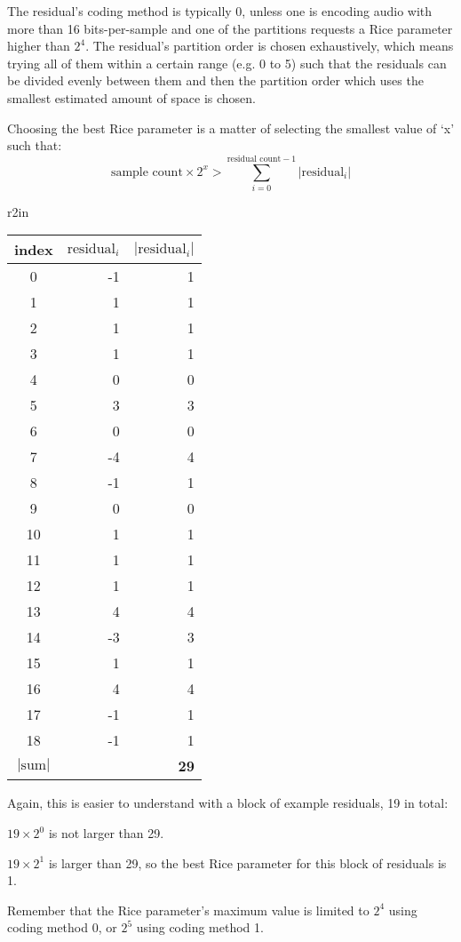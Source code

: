 The residual's coding method is typically 0, unless one is encoding
audio with more than 16 bits-per-sample and one of the partitions
requests a Rice parameter higher than $2 ^ 4$.
The residual's partition order is chosen exhaustively, which means
trying all of them within a certain range (e.g. 0 to 5) such that
the residuals can be divided evenly between them and then the partition
order which uses the smallest estimated amount of space is chosen.

Choosing the best Rice parameter is a matter of selecting the smallest
value of `x' such that:
\begin{equation}
\text{sample count} \times 2 ^ x > \overset{\text{residual count} - 1}{\underset{i = 0}{\sum}} |\text{residual}_i|
\end{equation}
\begin{wrapfigure}[10]{r}{2in}
\begin{tabular}{|c|r|r|}
\hline
index & $\text{residual}_i$ & $|\text{residual}_i|$ \\
\hline
0 & -1 & 1 \\
1 & 1 & 1 \\
2 & 1 & 1 \\
3 & 1 & 1 \\
4 & 0 & 0 \\
5 & 3 & 3 \\
6 & 0 & 0 \\
7 & -4 & 4 \\
8 & -1 & 1 \\
9 & 0 & 0 \\
10 & 1 & 1 \\
11 & 1 & 1 \\
12 & 1 & 1 \\
13 & 4 & 4 \\
14 & -3 & 3 \\
15 & 1 & 1 \\
16 & 4 & 4 \\
17 & -1 & 1 \\
18 & -1 & 1 \\
\hline
$|\text{sum}|$ & & \textbf{29} \\
\hline
\end{tabular}
\end{wrapfigure}
\par
Again, this is easier to understand with a block of example residuals,
19 in total:
\par
\noindent
$19 \times {2 ^ 0}$ is not larger than 29.
\par
\noindent
$19 \times {2 ^ 1}$ is larger than 29, so the best Rice parameter
for this block of residuals is 1.
\par
Remember that the Rice parameter's maximum value is limited to
$2 ^ 4$ using coding method 0, or $2 ^ 5$ using coding method 1.

